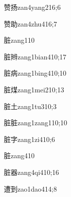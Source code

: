 \begin{verbete}{赞扬}{zan4yang2}{16;6}
\end{verbete}

\begin{verbete}{赞助}{zan4zhu4}{16;7}
\end{verbete}

\begin{verbete}{脏}{zang1}{10}
\end{verbete}

\begin{verbete}{脏辫}{zang1bian4}{10;17}
\end{verbete}

\begin{verbete}{脏病}{zang1bing4}{10;10}
\end{verbete}

\begin{verbete}{脏煤}{zang1mei2}{10;13}
\end{verbete}

\begin{verbete}{脏土}{zang1tu3}{10;3}
\end{verbete}

\begin{verbete}{脏脏}{zang1zang1}{10;10}
\end{verbete}

\begin{verbete}{脏字}{zang1zi4}{10;6}
\end{verbete}

\begin{verbete}{脏}{zang4}{10}
\end{verbete}

\begin{verbete}{脏器}{zang4qi4}{10;16}
\end{verbete}

\begin{verbete}{遭到}{zao1dao4}{14;8}
\end{verbete}

